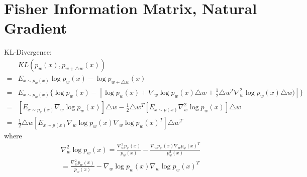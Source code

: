 \documentclass{article}
\begin{document}
\section{Fisher Information Matrix, Natural Gradient}
KL-Divergence:
\begin{eqnarray*}
&KL(p_w(x), p_{w+\triangle w}(x)) \\
=& E_{x\sim p_w(x)} \log p_w(x) - \log p_{w+\triangle w}(x)\\
=& E_{x\sim p_w(x)} \{\log p_w(x) - [\log p_w(x)+\nabla_w \log p_w(x)\triangle w + \frac{1}{2}\triangle w^T \nabla^2_w \log p_w(x)\triangle w)]\} \\
=& [E_{x\sim p_w(x)}\nabla_w \log p_w(x)]\triangle w -  \frac{1}{2}\triangle w^T [E_{x\sim p(x)}\nabla^2_w \log p_w(x)]\triangle w\\
= & \frac{1}{2}\triangle w[E_{x\sim p(x)}\nabla_w \log p_w(x)\nabla_w \log p_w(x)^T]\triangle w^T
\end{eqnarray*}
where
\begin{eqnarray*}
\nabla^2_w \log p_w(x) = \frac{\nabla^2_w p_w(x)}{p_w(x)} - \frac{\nabla_w p_w(x)\nabla_w p_w(x)^T}{p_w^2(x)} \\
= \frac{\nabla^2_w p_w(x)}{p_w(x)} - \nabla_w \log p_w(x)\nabla_w \log p_w(x)^T
\end{eqnarray*}
\end{document}
